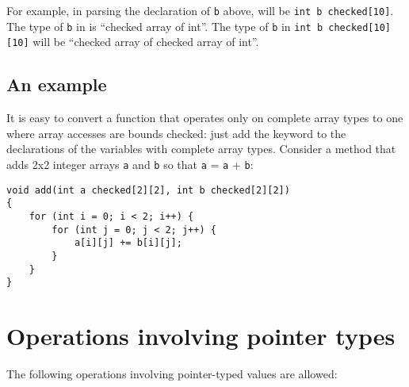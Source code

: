 For example, in parsing the declaration of \texttt{b} above, 
will be \texttt{int b checked[10]}. The type of \texttt{b} in
 is ``checked array of int''. The type of \texttt{b} in
\texttt{int b checked[10][10]} will be ``checked array of
checked array of int''.

\subsection{An example}

It is easy to convert a function that operates only on complete array
types to one where array accesses are bounds checked: just add the
 keyword to the declarations of the variables with complete array
types. Consider a method that adds 2x2 integer arrays \texttt{a} and
\texttt{b} so that \texttt{a} = \texttt{a} + \texttt{b}:

\begin{verbatim}
void add(int a checked[2][2], int b checked[2][2])
{
    for (int i = 0; i < 2; i++) {
        for (int j = 0; j < 2; j++) {
            a[i][j] += b[i][j];
        }
    }
}
\end{verbatim}

\section{Operations involving pointer types}

The following operations involving pointer-typed values are allowed:

